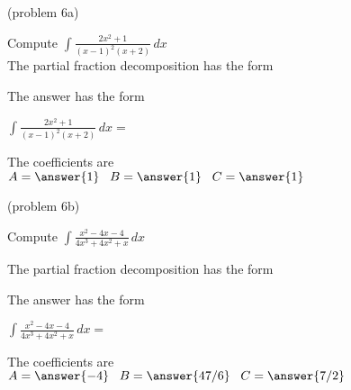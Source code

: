 \documentclass{ximera}
\begin{document}
\begin{problem}(problem 6a)

Compute $\displaystyle{\int \frac{2x^2 + 1}{(x-1)^2(x+2)}\, dx}$\\

The partial fraction decomposition has the form

\begin{multipleChoice}
\end{multipleChoice}

The answer has the form

$\displaystyle{\int \frac{2x^2 + 1}{(x-1)^2(x+2)} \, dx =}$

\begin{multipleChoice}
\end{multipleChoice}

The coefficients are\\
$A = \answer{1} \;\;\; B = \answer{1} \;\;\; C = \answer{1}$

\end{problem}




\begin{problem}(problem 6b)

Compute $\displaystyle{\int \frac{x^2 - 4x - 4}{4x^3 + 4x^2 + x} \, dx}$

The partial fraction decomposition has the form

\begin{multipleChoice}
\end{multipleChoice}



The answer has the form

$\displaystyle{\int \frac{x^2 - 4x - 4}{4x^3 + 4x^2 + x} \, dx =}$
\begin{multipleChoice}
\end{multipleChoice}

The coefficients are\\
$A = \answer{-4} \;\;\; B = \answer{47/6} \;\;\; C = \answer{7/2}$

\end{problem}
\end{document}
